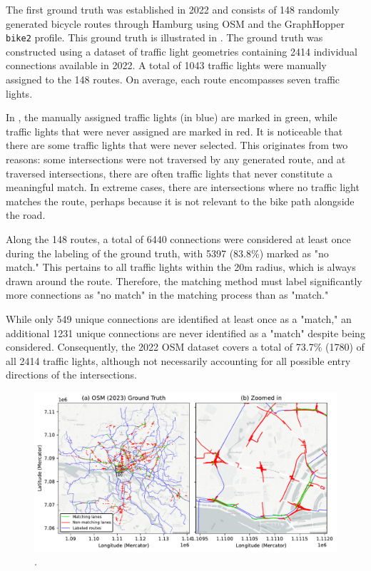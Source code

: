 The first ground truth was established in 2022 and consists of 148 randomly generated bicycle routes through Hamburg using OSM and the GraphHopper \texttt{bike2} profile. This ground truth is illustrated in . The ground truth was constructed using a dataset of traffic light geometries containing 2414 individual connections available in 2022. A total of 1043 traffic lights were manually assigned to the 148 routes. On average, each route encompasses seven traffic lights.

In , the manually assigned traffic lights (in blue) are marked in green, while traffic lights that were never assigned are marked in red. It is noticeable that there are some traffic lights that were never selected. This originates from two reasons: some intersections were not traversed by any generated route, and at traversed intersections, there are often traffic lights that never constitute a meaningful match. In extreme cases, there are intersections where no traffic light matches the route, perhaps because it is not relevant to the bike path alongside the road.

Along the 148 routes, a total of 6440 connections were considered at least once during the labeling of the ground truth, with 5397 (83.8\%) marked as "no match." This pertains to all traffic lights within the 20m radius, which is always drawn around the route. Therefore, the matching method must label significantly more connections as "no match" in the matching process than as "match."

While only 549 unique connections are identified at least once as a "match," an additional 1231 unique connections are never identified as a "match" despite being considered. Consequently, the 2022 OSM dataset covers a total of 73.7\% (1780) of all 2414 traffic lights, although not necessarily accounting for all possible entry directions of the intersections.

\begin{figure}[htbp]
\centering 
\includegraphics[width=\linewidth]{images/matching-ground-truth-osm.pdf}
\caption{.}
\label{fig:matching-ground-truth-osm}
\end{figure}

